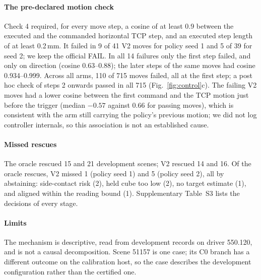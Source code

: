 \paragraph{The pre-declared motion check} Check 4 required, for every move step, a cosine of at least 0.9 between the executed and the commanded horizontal TCP step, and an executed step length of at least 0.2\,mm. It failed in 9 of 41 V2 moves for policy seed 1 and 5 of 39 for seed 2; we keep the official FAIL. In all 14 failures only the first step failed, and only on direction (cosine 0.63--0.88); the later steps of the same moves had cosine 0.934--0.999. Across all arms, 110 of 715 moves failed, all at the first step; a post hoc check of steps 2 onwards passed in all 715 (Fig.~\ref{fig:control}c). The failing V2 moves had a lower cosine between the first command and the TCP motion just before the trigger (median $-0.57$ against $0.66$ for passing moves), which is consistent with the arm still carrying the policy's previous motion; we did not log controller internals, so this association is not an established cause.

\paragraph{Missed rescues} The oracle rescued 15 and 21 development scenes; V2 rescued 14 and 16. Of the oracle rescues, V2 missed 1 (policy seed 1) and 5 (policy seed 2), all by abstaining: side-contact risk (2), held cube too low (2), no target estimate (1), and aligned within the reading bound (1). Supplementary Table~S3 lists the decisions of every stage.

\paragraph{Limits} The mechanism is descriptive, read from development records on driver 550.120, and is not a causal decomposition. Scene 51157 is one case; its C0 branch has a different outcome on the calibration host, so the case describes the development configuration rather than the certified one.
